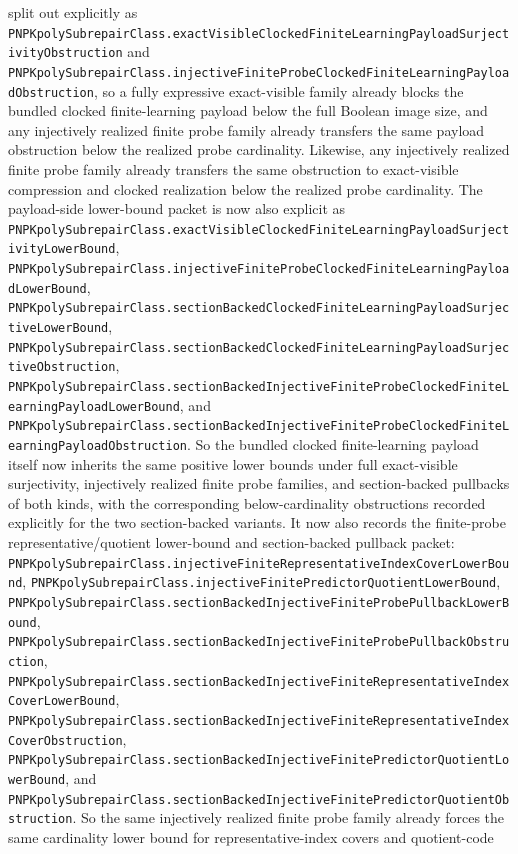 \documentclass[11pt]{article}
\theoremstyle{remark}
\begin{document}
split out explicitly as
\texttt{PNPKpolySubrepairClass.exactVisibleClockedFiniteLearningPayloadSurjectivityObstruction}
and
\texttt{PNPKpolySubrepairClass.injectiveFiniteProbeClockedFiniteLearningPayloadObstruction},
so a fully expressive exact-visible family already blocks the bundled clocked
finite-learning payload below the full Boolean image size, and any injectively
realized finite probe family already transfers the same payload obstruction
below the realized probe cardinality.  Likewise, any injectively realized
finite probe family already transfers the same obstruction to exact-visible
compression and clocked realization below the realized probe cardinality.
The payload-side lower-bound packet is now also explicit as
\texttt{PNPKpolySubrepairClass.exactVisibleClockedFiniteLearningPayloadSurjectivityLowerBound},
\texttt{PNPKpolySubrepairClass.injectiveFiniteProbeClockedFiniteLearningPayloadLowerBound},
\texttt{PNPKpolySubrepairClass.sectionBackedClockedFiniteLearningPayloadSurjectiveLowerBound},
\texttt{PNPKpolySubrepairClass.sectionBackedClockedFiniteLearningPayloadSurjectiveObstruction},
\texttt{PNPKpolySubrepairClass.sectionBackedInjectiveFiniteProbeClockedFiniteLearningPayloadLowerBound},
and
\texttt{PNPKpolySubrepairClass.sectionBackedInjectiveFiniteProbeClockedFiniteLearningPayloadObstruction}.
So the bundled clocked finite-learning payload itself now inherits the same
positive lower bounds under full exact-visible surjectivity, injectively
realized finite probe families, and section-backed pullbacks of both kinds,
with the corresponding below-cardinality obstructions recorded explicitly for
the two section-backed variants.
It now also records the finite-probe representative/quotient lower-bound and
section-backed pullback packet:
\texttt{PNPKpolySubrepairClass.injectiveFiniteRepresentativeIndexCoverLowerBound},
\texttt{PNPKpolySubrepairClass.injectiveFinitePredictorQuotientLowerBound},
\texttt{PNPKpolySubrepairClass.sectionBackedInjectiveFiniteProbePullbackLowerBound},
\texttt{PNPKpolySubrepairClass.sectionBackedInjectiveFiniteProbePullbackObstruction},
\texttt{PNPKpolySubrepairClass.sectionBackedInjectiveFiniteRepresentativeIndexCoverLowerBound},
\texttt{PNPKpolySubrepairClass.sectionBackedInjectiveFiniteRepresentativeIndexCoverObstruction},
\texttt{PNPKpolySubrepairClass.sectionBackedInjectiveFinitePredictorQuotientLowerBound},
and
\texttt{PNPKpolySubrepairClass.sectionBackedInjectiveFinitePredictorQuotientObstruction}.
So the same injectively realized finite probe family already forces the same
cardinality lower bound for representative-index covers and quotient-code
\end{document}
